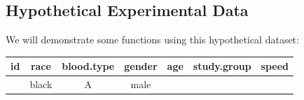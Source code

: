 \documentclass[]{book}
\newenvironment{Shaded}{\begin{snugshade}}{\end{snugshade}}
\newcommand{\KeywordTok}[1]{\textcolor[rgb]{0.13,0.29,0.53}{\textbf{#1}}}
\newcommand{\NormalTok}[1]{#1}
\newcommand{\OperatorTok}[1]{\textcolor[rgb]{0.81,0.36,0.00}{\textbf{#1}}}
\newcommand{\StringTok}[1]{\textcolor[rgb]{0.31,0.60,0.02}{#1}}
\theoremstyle{definition}
\theoremstyle{definition}
\theoremstyle{definition}
\theoremstyle{remark}
\begin{document}
\hypertarget{hypothetical-experimental-data}{%
\subsection{Hypothetical Experimental
Data}\label{hypothetical-experimental-data}}

We will demonstrate some functions using this hypothetical dataset:

\begin{Shaded}
\end{Shaded}

\begin{longtable}[]{@{}ccccccc@{}}
\toprule
\begin{minipage}[b]{0.06\columnwidth}\centering
id\strut
\end{minipage} & \begin{minipage}[b]{0.09\columnwidth}\centering
race\strut
\end{minipage} & \begin{minipage}[b]{0.15\columnwidth}\centering
blood.type\strut
\end{minipage} & \begin{minipage}[b]{0.10\columnwidth}\centering
gender\strut
\end{minipage} & \begin{minipage}[b]{0.07\columnwidth}\centering
age\strut
\end{minipage} & \begin{minipage}[b]{0.16\columnwidth}\centering
study.group\strut
\end{minipage} & \begin{minipage}[b]{0.09\columnwidth}\centering
speed\strut
\end{minipage}\tabularnewline
\midrule
\endhead
\begin{minipage}[t]{0.06\columnwidth}\centering
1\strut
\end{minipage} & \begin{minipage}[t]{0.09\columnwidth}\centering
black\strut
\end{minipage} & \begin{minipage}[t]{0.15\columnwidth}\centering
A\strut
\end{minipage} & \begin{minipage}[t]{0.10\columnwidth}\centering
male\strut
\end{minipage} & \begin{minipage}[t]{0.07\columnwidth}\centering

\end{minipage}
\end{longtable}
\end{document}
